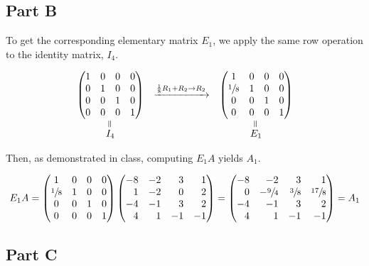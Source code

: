 \documentclass[12pt]{article}
\newcommand{\veq}{\mathrel{\rotatebox{90}{$=$}}}
\begin{document}
\subsection*{Part B}

To get the corresponding elementary matrix $E_1$, we apply the same row operation to the identity matrix, $I_4$.

$$
\begin{array}{ccc}
    \begin{pmatrix*}[c]
        1 & 0 & 0 & 0 \\
        0 & 1 & 0 & 0 \\
        0 & 0 & 1 & 0 \\
        0 & 0 & 0 & 1
    \end{pmatrix*}
    &\xrightarrow{\frac{1}{8}R_1 + R_2 \to R_2}
    &\begin{pmatrix*}[c]
        1 & 0 & 0 & 0 \\
        \sfrac{1}{8} & 1 & 0 & 0 \\
        0 & 0 & 1 & 0 \\
        0 & 0 & 0 & 1
    \end{pmatrix*}
    \\
    \overset{\veq}{I_4} & & \overset{\veq}{E_1}
\end{array}
$$

Then, as demonstrated in class, computing $E_1A$ yields $A_1$.

$$
E_1A = \begin{pmatrix*}[c]
        1 & 0 & 0 & 0 \\
        \sfrac{1}{8} & 1 & 0 & 0 \\
        0 & 0 & 1 & 0 \\
        0 & 0 & 0 & 1
\end{pmatrix*}
\begin{pmatrix*}[r]
    -8 & -2 & 3 & 1 \\
    1 & -2 &  0  & 2 \\
    -4 & -1 & 3 & 2 \\
    4 & 1 & -1 & -1
\end{pmatrix*}
= \begin{pmatrix*}[r]
        -8 & -2 & 3 & 1 \\
        0 & -\sfrac{9}{4} & \sfrac{3}{8}  & \sfrac{17}{8} \\
        -4 & -1 & 3 & 2 \\
        4 & 1 & -1 & -1
\end{pmatrix*}
= A_1
$$

\subsection*{Part C}
\end{document}
